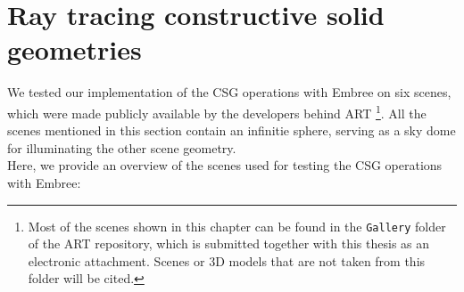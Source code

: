 \section{Ray tracing constructive solid geometries}
\label{sec:results_csg}
We tested our implementation of the CSG operations with Embree on six scenes, which were made publicly available by the developers behind ART \footnote{Most of the scenes shown in this chapter can be found in the \texttt{Gallery} folder of the ART repository, which is submitted together with this thesis as an electronic attachment. Scenes or 3D models that are not taken from this folder will be cited.}. All the scenes mentioned in this section contain an infinitie sphere, serving as a sky dome for illuminating the other scene geometry. 
\\

\noindent Here, we provide an overview of the scenes used for testing the CSG operations with Embree:
